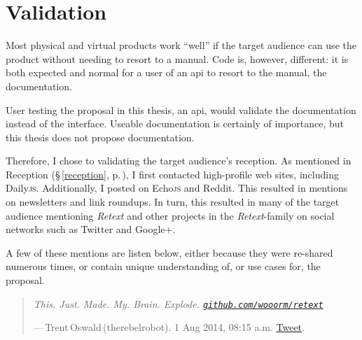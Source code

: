 
\begingroup
\let\clearpage\relax
\let\cleardoublepage\relax
\let\cleardoublepage\relax

\manualmark
{}

\chapter*{Validation}\label{addendum-validation}

Most physical and virtual products work ``well'' if the target audience can
  use the product without needing to resort to a manual.
Code is, however, different: it is both expected and normal for a user of
  an \gls{api} to resort to the manual, the documentation.

User testing the proposal in this thesis, an \gls{api}, would validate the
  documentation instead of the interface.
Useable documentation is certainly of importance, but this thesis does
  not propose documentation.

Therefore, I chose to validating the target audience's reception.
As mentioned in Reception (§\,\ref{reception}, p.\,\pageref{reception}),
  I first contacted high-profile web sites, including Daily\textsc{js}.
Additionally, I posted on Echo\textsc{js} and Reddit.
This resulted in mentions on newsletters and link roundups.
In turn, this resulted in many of the target audience mentioning \emph{Retext}
  and other projects in the \emph{Retext}-family on social networks such as
  Twitter and Google+.

A few of these mentions are listen below, either because they were re-shared
  numerous times, or contain unique understanding of, or use cases for, the
  proposal.

\begin{quote}
  \textit{This. Just. Made. My. Brain. Explode.
    \href{https://github.com/wooorm/retext}{\nolinkurl{github.com/wooorm/retext}}
  }

  \medskip ---\,Trent\,Oswald\,(therebelrobot). 1 Aug 2014, 08:15 a.m.
  \href{https://twitter.com/therebelrobot/status/495226217805524992}{Tweet}.
\end{quote}

